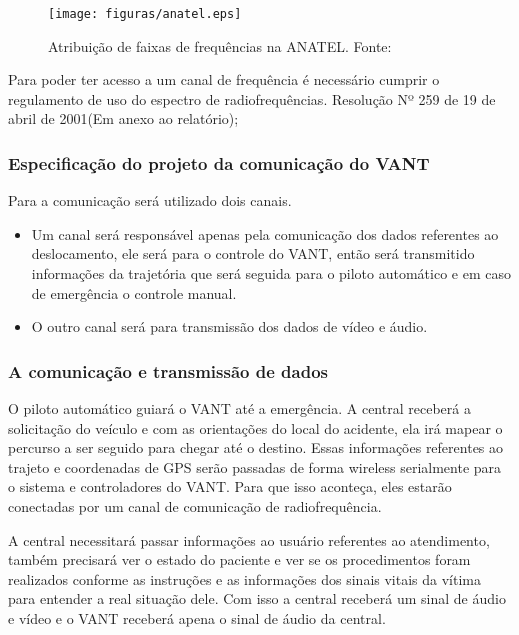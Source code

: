 \begin{figure}[H]
	\centering
	  \texttt{[image: figuras/anatel.eps]}
	\caption{Atribuição de faixas de frequências na ANATEL. Fonte: \cite{anatel}}
	\label{fig:tabela}
\end{figure}


Para poder ter acesso a um canal de frequência é necessário cumprir o regulamento de uso do espectro de radiofrequências. Resolução Nº 259 de 19 de abril de 2001(Em anexo ao relatório);

\subsubsection{Especificação do projeto da comunicação do VANT}

Para a comunicação será utilizado dois canais.

\begin{itemize}
	\item Um canal será responsável apenas pela comunicação dos dados referentes ao deslocamento, ele será para o controle do VANT, então será transmitido informações da trajetória que será seguida para o piloto automático e em caso de emergência o controle manual.
	\item O outro canal será para transmissão dos dados de vídeo e áudio.
\end{itemize}

\subsubsection{A comunicação e transmissão de dados }

O piloto automático guiará o VANT até a emergência. A central receberá a solicitação do veículo e com as orientações do local do acidente, ela irá mapear o percurso a ser seguido para chegar até o destino.  Essas informações referentes ao trajeto e coordenadas de GPS serão passadas de forma wireless serialmente para o sistema e controladores do VANT. Para que isso aconteça, eles estarão conectadas por um canal de comunicação de radiofrequência.

A central necessitará passar informações ao usuário referentes ao atendimento, também precisará ver o estado do paciente e ver se os procedimentos foram realizados conforme as instruções e as informações dos sinais vitais da vítima para entender a real situação dele. Com isso a central receberá um sinal de áudio e vídeo e o VANT receberá apena o sinal de áudio da central. 

